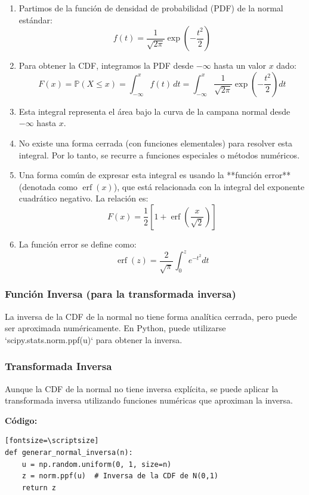 \documentclass{article}
\begin{document}
\begin{enumerate}
  \item Partimos de la función de densidad de probabilidad (PDF) de la normal estándar:
  \[
  f(t) = \frac{1}{\sqrt{2\pi}} \exp\left(-\frac{t^2}{2}\right)
  \]
  
  \item Para obtener la CDF, integramos la PDF desde $-\infty$ hasta un valor $x$ dado:
  \[
  F(x) = \mathbb{P}(X \leq x) = \int_{-\infty}^{x} f(t)\, dt = \int_{-\infty}^{x} \frac{1}{\sqrt{2\pi}} \exp\left(-\frac{t^2}{2}\right) dt
  \]
  
  \item Esta integral representa el área bajo la curva de la campana normal desde $-\infty$ hasta $x$.
  
  \item No existe una forma cerrada (con funciones elementales) para resolver esta integral. Por lo tanto, se recurre a funciones especiales o métodos numéricos.
  
  \item Una forma común de expresar esta integral es usando la **función error** (denotada como $\operatorname{erf}(x)$), que está relacionada con la integral del exponente cuadrático negativo. La relación es:
  \[
  F(x) = \frac{1}{2} \left[1 + \operatorname{erf}\left(\frac{x}{\sqrt{2}}\right)\right]
  \]
  
  \item La función error se define como:
  \[
  \operatorname{erf}(z) = \frac{2}{\sqrt{\pi}} \int_0^z e^{-t^2} dt
  \]
  

\end{enumerate}


\subsubsection*{Función Inversa (para la transformada inversa)}
La inversa de la CDF de la normal no tiene forma analítica cerrada, pero puede ser aproximada numéricamente. En Python, puede utilizarse `scipy.stats.norm.ppf(u)` para obtener la inversa.

\subsubsection{Transformada Inversa}
Aunque la CDF de la normal no tiene inversa explícita, se puede aplicar la transformada inversa utilizando funciones numéricas que aproximan la inversa.

\textbf{Código:}
\begin{verbatim}[fontsize=\scriptsize]
def generar_normal_inversa(n):
    u = np.random.uniform(0, 1, size=n)
    z = norm.ppf(u)  # Inversa de la CDF de N(0,1)
    return z
\end{verbatim}
\end{document}
